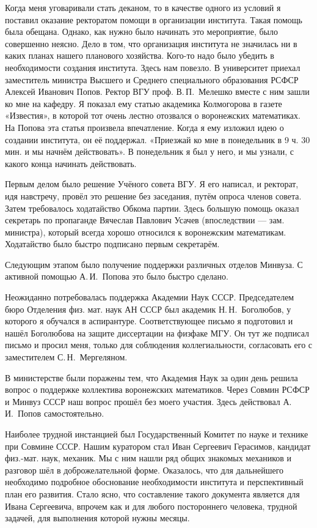 Когда меня уговаривали стать деканом, то в качестве одного из условий я
поставил оказание ректоратом помощи в организации института. Такая помощь была обещана. Однако, как нужно было начинать это мероприятие, было совершенно неясно. Дело в том, что организация института не значилась ни в каких планах нашего планового хозяйства. Кого-то надо было убедить в необходимости создания института. Здесь нам повезло. В университет приехал заместитель министра Высшего и Среднего специального образования РСФСР Алексей Иванович Попов. Ректор ВГУ проф. В.\,П.~Мелешко вместе с ним зашли ко мне на кафедру. Я показал ему статью академика Колмогорова в газете «Известия», в которой тот очень лестно отозвался о воронежских математиках. На Попова эта статья произвела впечатление. Когда я ему изложил идею о создании института, он её поддержал. «Приезжай ко мне в понедельник в 9 ч. 30 мин. и мы начнём действовать». В понедельник я был у него, и мы узнали, с какого конца начинать действовать.

Первым делом было решение Учёного совета ВГУ. Я его написал, и ректорат, идя навстречу, провёл это решение без заседания, путём опроса членов совета. Затем требовалось ходатайство Обкома партии. Здесь большую помощь оказал секретарь по пропаганде Вячеслав Павлович Усачев (впоследствии --- зам. министра), который всегда хорошо относился к воронежским математикам. Ходатайство было быстро подписано первым секретарём.

Следующим этапом было получение поддержки различных отделов Минвуза. С активной помощью А.\,И.~Попова это было быстро сделано.

Неожиданно потребовалась поддержка Академии Наук СССР. Председателем бюро Отделения физ. мат. наук АН СССР был академик Н.\,Н.~Боголюбов, у которого я обучался в аспирантуре. Соответствующее письмо я подготовил и нашёл Боголюбова на защите диссертации на физфаке МГУ. Он тут же подписал письмо и просил меня, только для соблюдения коллегиальности, согласовать его с заместителем С.\,Н.~Мергеляном.

В министерстве были поражены тем, что Академия Наук за один день решила вопрос о поддержке коллектива воронежских математиков. Через Совмин РСФСР и Минвуз СССР наш вопрос прошёл без моего участия. Здесь действовал А.\,И.~Попов самостоятельно.

Наиболее трудной инстанцией был Государственный Комитет по науке и технике при Совмине СССР.
Нашим куратором стал Иван Сергеевич Герасимов, кандидат физ.-мат. наук, механик. Мы с ним нашли ряд общих знакомых механиков и разговор шёл в доброжелательной форме. Оказалось, что для дальнейшего необходимо подробное обоснование необходимости института и перспективный план его развития. Стало ясно, что составление такого документа является для Ивана Сергеевича, впрочем как и для любого постороннего человека, трудной задачей, для выполнения которой нужны месяцы.

